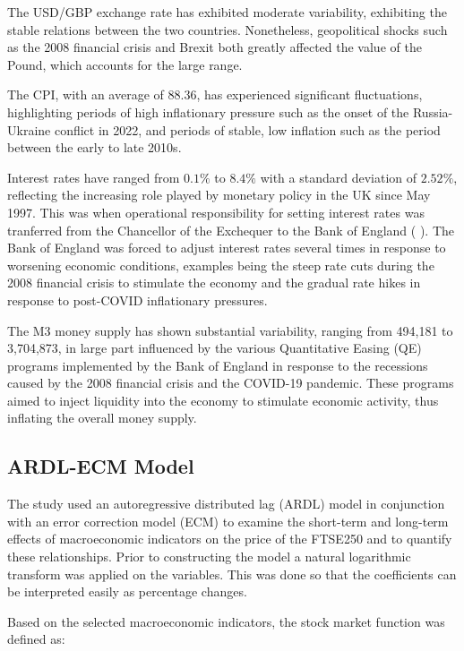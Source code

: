 \documentclass[11pt,a4paper]{article}
\newcommand{\citeboth}[1]{\citeauthor{#1} \citep{#1}}
\begin{document}
The USD/GBP exchange rate has exhibited moderate variability, exhibiting the stable relations between 
the two countries. Nonetheless, geopolitical shocks such as the 2008 financial crisis and Brexit both greatly affected the value of the Pound, 
which accounts for the large range. 

The CPI, with an average of 88.36, has 
experienced significant fluctuations, highlighting periods of high inflationary pressure such as the onset of the Russia-Ukraine conflict in 2022, and periods of stable, low
inflation such as the period between the early to late 2010s.

Interest rates have ranged from $0.1\%$ to $8.4\%$ with a standard deviation of $2.52\%$, reflecting the 
increasing role played by monetary policy in the UK since May 1997. This was when operational responsibility for setting interest rates was tranferred from the Chancellor of the Exchequer to the Bank of England (\citeboth{king1997changes}). The Bank of England was forced to adjust interest rates 
several times in response to worsening economic conditions, examples being the steep rate cuts during the 2008 financial crisis to stimulate the economy and the gradual rate hikes in response to 
post-COVID inflationary pressures. 

The M3 money supply has shown substantial variability, ranging from 494,181 to 3,704,873, 
in large part influenced by the various Quantitative Easing (QE) programs implemented by the Bank of England 
in response to the recessions caused by the 2008 financial crisis and the COVID-19 pandemic. These programs aimed to inject liquidity into the economy to stimulate economic activity, thus inflating the overall money supply.

\subsection{ARDL-ECM Model}

The study used an autoregressive distributed lag (ARDL) model in conjunction with 
an error correction model (ECM) to examine the short-term and long-term effects of macroeconomic indicators on the price of the FTSE250
and to quantify these relationships. Prior to constructing the model a natural logarithmic transform was applied
on the variables. This was done so that the coefficients can be interpreted easily as percentage changes. 

Based on the selected macroeconomic indicators,
the stock market function was defined as:
\end{document}

